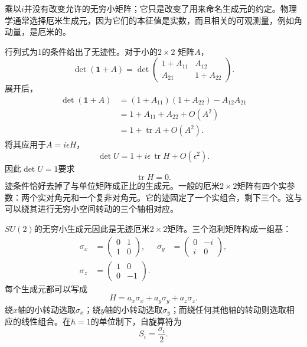 乘以\(i\)并没有改变允许的无穷小矩阵；它只是改变了用来命名生成元的约定。物理学通常选择厄米生成元，因为它们的本征值是实数，而且相关的可观测量，例如角动量，是厄米的。

行列式为1的条件给出了无迹性。对于小的\(2\times2\)
矩阵\(A\)，
\begin{equation}
\det(\boldsymbol 1+A)
=
\det
\begin{pmatrix}
1+A_{11}&A_{12}\\
A_{21}&1+A_{22}
\end{pmatrix}.
\end{equation}
展开后，
\begin{align}
\det(\boldsymbol 1+A)
 &=(1+A_{11})(1+A_{22})-A_{12}A_{21}\\
 &=1+A_{11}+A_{22}+O(A^2)\\
 &=1+\operatorname{tr}A+O(A^2).
\end{align}
将其应用于\(A=i\epsilon H\)，
\begin{equation}
\det U=1+i\epsilon\,\operatorname{tr}H+O(\epsilon^2).
\end{equation}
因此\(\det U=1\)要求
\begin{equation}
\operatorname{tr}H=0.
\end{equation}
迹条件恰好去掉了与单位矩阵成正比的生成元。一般的厄米\(2\times2\)矩阵有四个实参数：两个实对角元和一个复非对角元。它的迹固定了一个实组合，剩下三个。这与可以绕其进行无穷小空间转动的三个轴相对应。

\(SU(2)\)的无穷小生成元因此是无迹厄米\(2\times2\)矩阵。三个泡利矩阵构成一组基：
\begin{equation}
\begin{aligned}
\sigma_x&=
\begin{pmatrix}0&1\\1&0\end{pmatrix},
&
\sigma_y&=
\begin{pmatrix}0&-i\\i&0\end{pmatrix},
\\[0.4em]
\sigma_z&=
\begin{pmatrix}1&0\\0&-1\end{pmatrix}.
\end{aligned}
\end{equation}
每个生成元都可以写成
\begin{equation}
H=a_x\sigma_x+a_y\sigma_y+a_z\sigma_z.
\end{equation}
绕\(x\)轴的小转动选取\(\sigma_x\)；绕\(y\)轴的小转动选取\(\sigma_y\)；而绕任何其他轴的转动则选取相应的线性组合。在\(\hbar=1\)的单位制下，自旋算符为
\begin{equation}
S_i=\frac{\sigma_i}{2}.
\end{equation}

